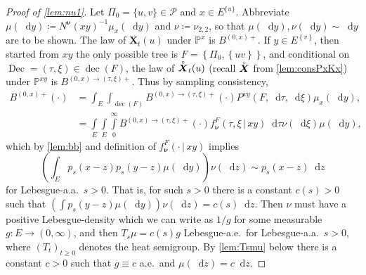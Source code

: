 \documentclass[reqno,draft]{amsart}
\numberwithin{equation}{section}
\theoremstyle{plain}
\theoremstyle{remark}
\renewcommand{\P}{\mathbb{P}} %
\newcommand*\diff{\mathop{}\!\mathrm{d}}
\newcommand{\fpart}{\Pi} %
\DeclareMathOperator{\dcb}{dec}
\DeclareMathOperator{\dc}{Dec}
\newcommand{\fnu}{f_{\boldsymbol \nu}}
\newcommand{\rs}[1]{\accentset{\circ}{#1}} %
\begin{document}
\begin{proof}[Proof of \cref{lem:nu1}]
    Let $\fpart_0 = \{u,v\}\in \mathcal{P}$ and $x \in E^{\{u\}} $. Abbreviate $\mu(\diff y) \coloneqq N^{\boldsymbol \nu}(xy)^{-1} \mu_x(\diff y)$ and $\nu\coloneqq \nu_{2,2}$, so that $\mu(\diff y),\nu(\diff y) \sim \diff y$ are to be shown. The law of $\boldsymbol X_t(u)$ under $\P^{x}$ is $B^{(0,x)+}$. If $y\in E^{\left\{ v \right\} }$, then started from $xy$ the only possible tree is $F = \left\{ \fpart_0,\left\{ uv \right\}  \right\} $, and conditional on $\dc = (\tau,\xi) \in \dcb(F)$, the law of $\rs{\boldsymbol X}_t(u)$ (recall $\rs{\boldsymbol X}$ from \cref{lem:consPxKx}) under $\P^{xy}$ is $B^{(0,x)\to(\tau,\xi)+}$. Thus by sampling consistency,
    \begin{align*}
        B^{(0,x)+}(\cdot )
        &= \int_E \int_{\dcb(F)} B^{(0,x)\to (\tau,\xi)+}(\cdot ) P^{xy}(F,\diff \tau, \diff \xi)\mu_x(\diff y), \nonumber\\
        &= \int\limits_E \int\limits_E \int\limits_0^\infty B^{(0,x)\to (\tau,\xi)+}(\cdot ) \fnu^F(\tau,\xi \,\vert\,xy) \diff \tau \nu(\diff \xi) \mu(\diff y),\label{eqprf:nu1:1}
    \end{align*}
    which by \cref{lem:bb} and definition of $\fnu^F(\cdot \,\vert\,xy)$ implies \[
        \left( \int_E p_s(x-z) p_s(y-z) \mu(\diff y) \right) \nu(\diff z) \sim p_s(x-z) \diff z
    \] %
    for Lebesgue-a.a.\ $s > 0$. That is, for such $s > 0$ there is a constant $c(s) > 0$ such that $\left( \int p_s(y-z) \mu(\diff y) \right) \nu(\diff z) = c(s) \diff z$. Then $\nu$ must have a positive Lebesgue-density which we can write as $1 / g$ for some measurable $g\colon E\to (0,\infty)$, and then $T_s \mu = c(s) g$ Lebesgue-a.e.\ for Lebesgue-a.a.\ $s>0$, where $(T_t)_{t\ge 0}$ denotes the heat semigroup. By \cref{lem:Tsmu} below there is a constant $c > 0$ such that $g \equiv c$ a.e.\ and $\mu(\diff z) = c \diff z$.
\end{proof}
\end{document}
